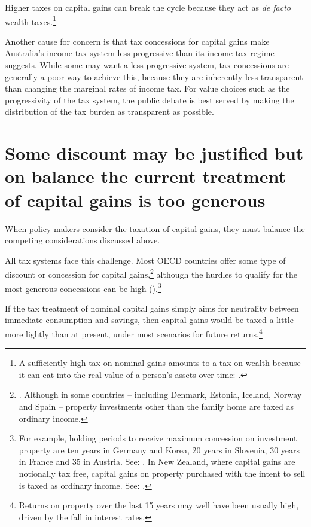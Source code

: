 Higher taxes on capital gains can break the cycle because they act as \emph{de facto} wealth taxes.\footnote{A sufficiently high tax on nominal gains amounts to a tax on wealth because it can eat into the real value of a person's assets over time: \textcite{Cowen2013}.}

Another cause for concern is that tax concessions for capital gains make Australia’s income tax system less progressive than its income tax regime suggests. While some may want a less progressive system, tax concessions are generally a poor way to achieve this, because they are inherently less transparent than changing the marginal rates of income tax. For value choices such as the progressivity of the tax system, the public debate is best served by making the distribution of the tax burden as transparent as possible. %

\section{Some discount may be justified but on balance the current treatment of capital gains is too generous}
When policy makers consider the taxation of capital gains, they must balance the competing considerations discussed above. 

All tax systems face this challenge. Most OECD countries offer some type of discount or concession for capital gains,\footnote{\textcite{Harding2013}. Although in some countries – including Denmark, Estonia, Iceland, Norway and Spain – property investments other than the family home are taxed as ordinary income.} although the hurdles to qualify for the most generous concessions can be high ().\footnote{For example, holding periods to receive maximum concession on investment property are ten years in Germany and Korea, 20 years in Slovenia, 30 years in France and 35 in Austria. See: \textcite[][]{Harding2013}. In New Zealand, where capital gains are notionally tax free, capital gains on property purchased with the intent to sell is taxed as ordinary income. See: \textcite[][]{InlandRevenueNewZealand2015MistakingPropertyDealingForPropertyInvestment}.} 

If the tax treatment of nominal capital gains simply aims for neutrality between immediate consumption and savings, then capital gains would be taxed a little more lightly than at present, under most scenarios for future returns.\footnote{Returns on property over the last 15 years may well have been usually high, driven by the fall in interest rates.} 

